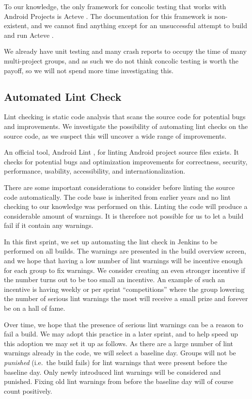 To our knowledge, the only framework for concolic testing that works with Android Projects is Acteve \parencite{AnandNHY12, AnandH11}. The documentation for this framework is non-existent, and we cannot find anything except for an unsuccessful attempt to build and run Acteve \parencite{chenxiong-acteve}.

We already have unit testing and many crash reports to occupy the time of many multi-project groups, and as such we do not think concolic testing is worth the payoff, so we will not spend more time investigating this.

\subsection{Automated Lint Check}\label{sec:automated_lint}
Lint checking is static code analysis that scans the source code for potential bugs and improvements. We investigate the possibility of automating lint checks on the source code, as we suspect this will uncover a wide range of improvements.

An official tool, Android Lint \parencite{AndroidLint}, for linting Android project source files exists. It checks for potential bugs and optimization improvements for correctness, security, performance, usability, accessibility, and internationalization.

There are some important considerations to consider before linting the source code automatically. The code base is inherited from earlier years and no lint checking to our knowledge was performed on this. Linting the code will produce a considerable amount of warnings. It is therefore not possible for us to let a build fail if it contain any warnings.

In this first sprint, we set up automating the lint check in Jenkins to be performed on all builds. The warnings are presented in the build overview screen, and we hope that having a low number of lint warnings will be incentive enough for each group to fix warnings. We consider creating an even stronger incentive if the number turns out to be too small an incentive. An example of such an incentive is having weekly or per sprint ``competitions'' where the group lowering the number of serious lint warnings the most will receive a small prize and forever be on a hall of fame.

Over time, we hope that the presence of serious lint warnings can be a reason to fail a build. We may adopt this practice in a later sprint, and to help speed up this adoption we may set it up as follows. As there are a large number of lint warnings already in the code, we will select a baseline day. Groups will not be \emph{punished} (i.e.\ the build fails) for lint warnings that were present before the baseline day. Only newly introduced lint warnings will be considered and punished. Fixing old lint warnings from before the baseline day will of course count positively.

